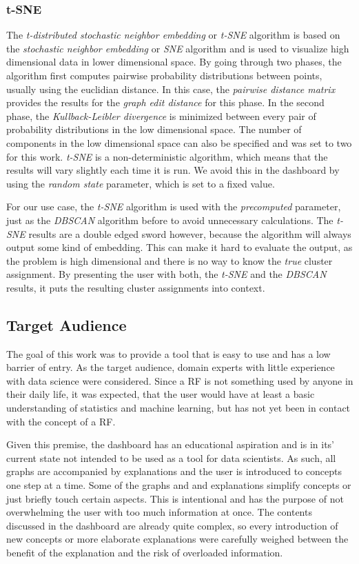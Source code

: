 \documentclass[a4paper, 12pt]{article}
\begin{document}
\subsubsection{t-SNE}
The \textit{t-distributed stochastic neighbor embedding} or \textit{t-SNE} algorithm is based on
the \textit{stochastic neighbor embedding} or \textit{SNE} \cite{hinton2002stochastic} algorithm
and is used to visualize high dimensional data in lower dimensional space. By going through two
phases, the algorithm first computes pairwise probability distributions between points, usually
using the euclidian distance. In this case, the \textit{pairwise distance matrix} provides the
results for the \textit{graph edit distance} for this phase. In the second phase, the
\textit{Kullback-Leibler divergence} \cite{csiszar1975divergence} is minimized between every pair
of probability distributions in the low dimensional space. The number of components in the low
dimensional space can also be specified and was set to two for this work.
\textit{t-SNE} is a non-deterministic algorithm, which means that the results will vary slightly
each time it is run. We avoid this in the dashboard by using the \textit{random state} parameter,
which is set to a fixed value. \par
For our use case, the \textit{t-SNE} algorithm is used with the \textit{precomputed} parameter,
just as the \textit{DBSCAN} algorithm before to avoid unnecessary calculations.
The \textit{t-SNE} results are a double edged sword however, because the algorithm will always
output some kind of embedding. This can make it hard to evaluate the output, as the problem is
high dimensional and there is no way to know the \textit{true} cluster assignment.
By presenting the user with both, the \textit{t-SNE} and the \textit{DBSCAN} results, it puts the
resulting cluster assignments into context.

\subsection{Target Audience}
The goal of this work was to provide a tool that is easy to use and has a low barrier of entry.
As the target audience, domain experts with little experience with data science were considered.
Since a RF is not something used by anyone in their daily life, it was expected, that the user
would have at least a basic understanding of statistics and machine learning, but has not yet
been in contact with the concept of a RF. \par
Given this premise, the dashboard has an educational aspiration and is in its' current state
not intended to be used as a tool for data scientists. As such, all graphs are accompanied by
explanations and the user is introduced to concepts one step at a time. Some of the graphs and
and explanations simplify concepts or just briefly touch certain aspects. This is intentional
and has the purpose of not overwhelming the user with too much information at once. The contents
discussed in the dashboard are already quite complex, so every introduction of new concepts
or more elaborate explanations were carefully weighed between the benefit of the explanation
and the risk of overloaded information. \par
\end{document}
